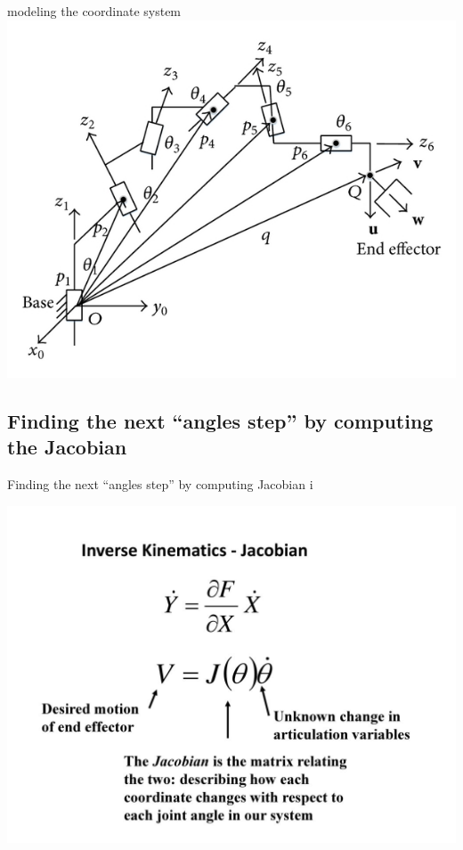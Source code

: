 \documentclass{beamer}
\begin{document}
\begin{frame}[allowframebreaks]{modeling the coordinate system}
\center
\includegraphics[scale = 1.8]{A-6R-manipulator-with-normal-configuration.png}\cite{4}

\end{frame}

\subsection{Finding the next ``angles step'' by computing the Jacobian}
\begin{frame}{Finding the next ``angles step'' by computing Jacobian i}


\includegraphics[scale = 1.2]{slide_30.jpg}\cite{5}
\end{frame}
\end{document}
